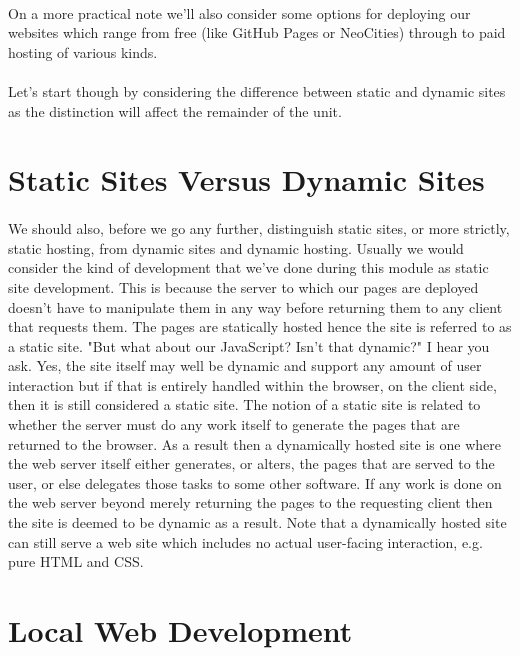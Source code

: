 \paragraph{} On a more practical note we'll also consider some options for deploying our websites which range from free (like GitHub Pages or NeoCities) through to paid hosting of various kinds. 
\paragraph{} Let's start though by considering the difference between static and dynamic sites as the distinction will affect the remainder of the unit.


\section{Static Sites Versus Dynamic Sites}

\paragraph{} We should also, before we go any further, distinguish static sites, or more strictly, static hosting, from dynamic sites and dynamic hosting. Usually we would consider the kind of development that we've done during this module as static site development. This is because the server to which our pages are deployed doesn't have to manipulate them in any way before returning them to any client that requests them. The pages are statically hosted hence the site is referred to as a static site. "But what about our JavaScript? Isn't that dynamic?" I hear you ask. Yes, the site itself may well be dynamic and support any amount of user interaction but if that is entirely handled within the browser, on the client side, then it is still considered a static site. The notion of a static site is related to whether the server must do any work itself to generate the pages that are returned to the browser. As a result then a dynamically hosted site is one where the web server itself either generates, or alters, the pages that are served to the user, or else delegates those tasks to some other software. If any work is done on the web server beyond merely returning the pages to the requesting client then the site is deemed to be dynamic as a result. Note that a dynamically hosted site can still serve a web site which includes no actual user-facing interaction, e.g. pure HTML and CSS.


\section{Local Web Development}
